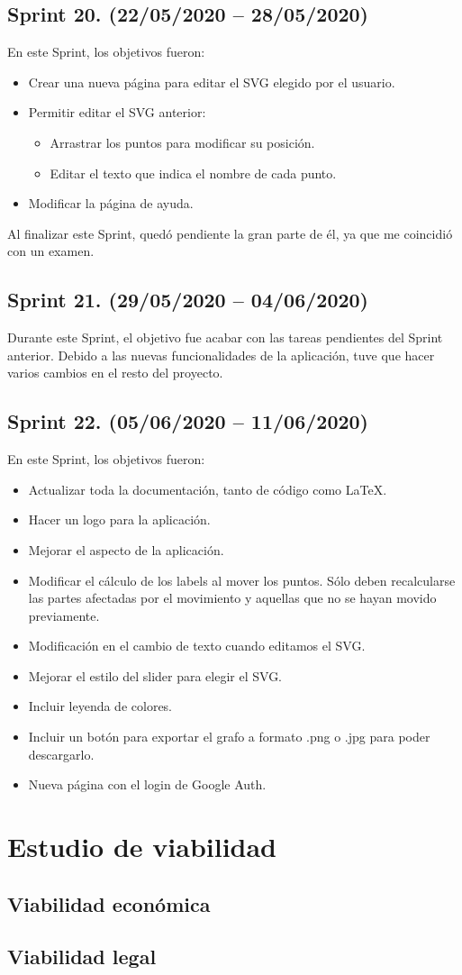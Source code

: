 \subsection{Sprint 20. (22/05/2020 -- 28/05/2020)}
En este Sprint, los objetivos fueron:
\begin{itemize}
	\item Crear una nueva página para editar el SVG elegido por el usuario.
	\item Permitir editar el SVG anterior:
	\begin{itemize}
		\item Arrastrar los puntos para modificar su posición.
		\item Editar el texto que indica el nombre de cada punto.
	\end{itemize}
	\item Modificar la página de ayuda.
\end{itemize}
Al finalizar este Sprint, quedó pendiente la gran parte de él, ya que me coincidió con un examen.

\subsection{Sprint 21. (29/05/2020 -- 04/06/2020)}
Durante este Sprint, el objetivo fue acabar con las tareas pendientes del Sprint anterior. Debido a las nuevas funcionalidades de la aplicación, tuve que hacer varios cambios en el resto del proyecto.

\subsection{Sprint 22. (05/06/2020 -- 11/06/2020)}
En este Sprint, los objetivos fueron:
\begin{itemize}
	\item Actualizar toda la documentación, tanto de código como \LaTeX.
	\item Hacer un logo para la aplicación.
	\item Mejorar el aspecto de la aplicación.
	\item Modificar el cálculo de los labels al mover los puntos. Sólo deben recalcularse las partes afectadas por el movimiento y aquellas que no se hayan movido previamente.
	\item Modificación en el cambio de texto cuando editamos el SVG.
	\item Mejorar el estilo del slider para elegir el SVG.
	\item Incluir leyenda de colores.
	\item Incluir un botón para exportar el grafo a formato .png o .jpg para poder descargarlo.
	\item Nueva página con el login de Google Auth.
\end{itemize}

\section{Estudio de viabilidad}

\subsection{Viabilidad económica}

\subsection{Viabilidad legal}


